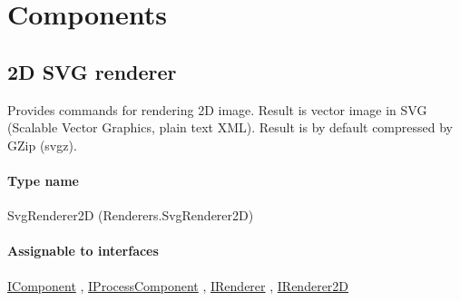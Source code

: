 




\section{Components}

	


\subsection{2D SVG renderer}
\label{Malsys.Processing.Components.Renderers.SvgRenderer2D}
Provides commands for rendering 2D image.
            Result is vector image in SVG (Scalable Vector Graphics, plain text XML).
            Result is by default compressed by GZip (svgz).\paragraph{Type name}
SvgRenderer2D (Renderers.SvgRenderer2D) 	\paragraph{Assignable to interfaces}
		\hyperref[Malsys.Processing.Components.IComponent]{IComponent}%
, 		\hyperref[Malsys.Processing.Components.IProcessComponent]{IProcessComponent}%
, 		\hyperref[Malsys.Processing.Components.IRenderer]{IRenderer}%
, 		\hyperref[Malsys.Processing.Components.Renderers.IRenderer2D]{IRenderer2D}%
